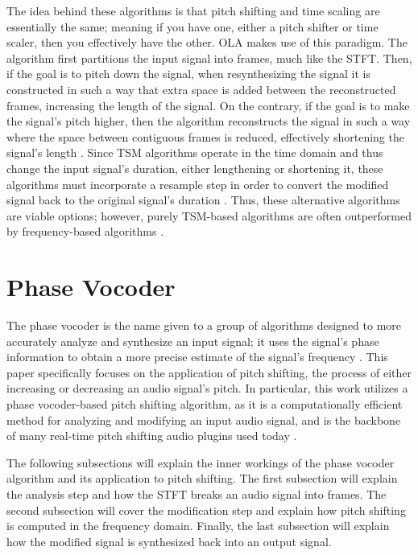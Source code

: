 \documentclass[12pt]{article}
\begin{document}
The idea behind these algorithms is that pitch shifting and time scaling are essentially the same; meaning if you have one, 
either a pitch shifter or time scaler, then you effectively have the other. OLA makes use of this paradigm. The algorithm first partitions the input signal into frames, much like the STFT. 
Then, if the goal is to pitch down the signal, when resynthesizing the signal it is constructed in such a way that extra space is added between the reconstructed frames, increasing the length of the signal. 
On the contrary, if the goal is to make the signal's pitch higher, then the algorithm reconstructs the signal in such a way where the space between contiguous frames is reduced, effectively shortening the signal's length \cite{royer2019pitch}.
Since TSM algorithms operate in the time domain and thus change the input signal's duration, either lengthening or shortening it, these algorithms must incorporate a resample step in order to convert the modified signal back to the original signal's duration \cite{rai2019analysis}.
Thus, these alternative algorithms are viable options; however, purely TSM-based algorithms are often outperformed by frequency-based algorithms \cite{royer2019pitch}.

\section{Phase Vocoder}

The phase vocoder is the name given to a group of algorithms designed to more accurately analyze and synthesize an input signal; it uses the signal's phase information to obtain a more precise estimate of the signal's frequency \cite{reiss2014audioeffects}. This paper specifically focuses on the application of pitch shifting, the process of either increasing or decreasing an audio signal's pitch. 
In particular, this work utilizes a phase vocoder-based pitch shifting algorithm, as it is a computationally efficient method for analyzing and modifying an input audio signal, and is the backbone of many real-time pitch shifting audio plugins used today \cite{royer2019pitch}.


The following subsections will explain the inner workings of the phase vocoder algorithm and its application to pitch shifting. 
The first subsection will explain the analysis step and how the STFT breaks an audio signal into frames. 
The second subsection will cover the modification step and explain how pitch shifting is computed in the frequency domain. 
Finally, the last subsection will explain how the modified signal is synthesized back into an output signal.
\end{document}
